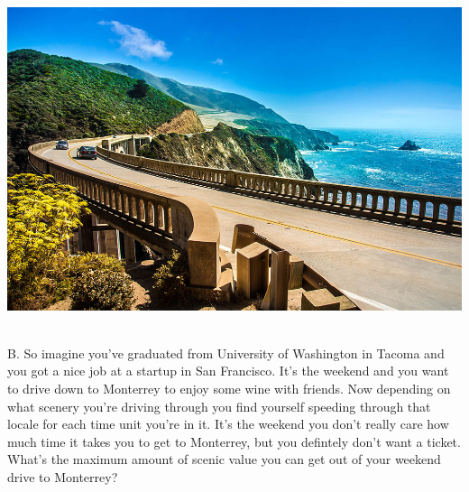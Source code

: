 \documentclass[12pt]{article}
\begin{document}
\noindent \centerline{\includegraphics[scale = 1.25]{brix.jpg}}\\
B. So imagine you've graduated from University of Washington
in Tacoma and you got a nice job at a startup in San Francisco. It's the weekend
and you want to drive down to Monterrey to enjoy some wine with friends.
Now depending on what scenery you're driving through you find yourself
speeding through that locale for each time unit you're in it. It's the weekend
you don't really care how much time it takes you to get to Monterrey, but you
defintely don't want a ticket. What's the maximum amount of scenic value you can get
out of your weekend drive to Monterrey?
\end{document}
